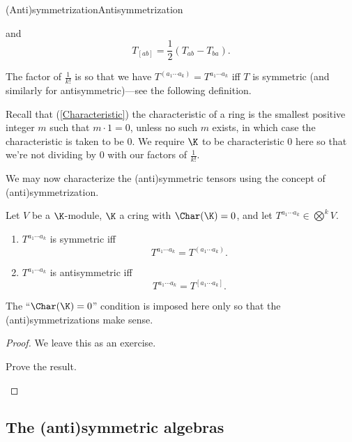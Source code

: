 \begin{dfn}{(Anti)symmetrization}{Antisymmetrization}
\begin{rmk}
		and
		\begin{equation}
			T_{[ab]}=\frac{1}{2}(T_{ab}-T_{ba}).
		\end{equation}
	\end{rmk}
	\begin{rmk}
		The factor of $\frac{1}{k!}$ is so that we have $T^{(a_1\cdots a_k)}=T^{a_1\cdots a_k}$ iff $T$ is symmetric (and similarly for antisymmetric)---see the following definition.
	\end{rmk}
	\begin{rmk}
		Recall that (\cref{Characteristic}) the characteristic of a ring is the smallest positive integer $m$ such that $m\cdot 1=0$, unless no such $m$ exists, in which case the characteristic is taken to be $0$.  We require $\K$ to be characteristic $0$ here so that we're not dividing by $0$ with our factors of $\frac{1}{k!}$.
	\end{rmk}
\end{dfn}
We may now characterize the (anti)symmetric tensors using the concept of (anti)symmetrization.
\begin{prp}{}{}
	Let $V$ be a $\K$-module, $\K$ a cring with $\Char (\K )=0$, and let $T^{a_1\cdots a_k}\in \bigotimes ^kV$.
	\begin{enumerate}
		\item $T^{a_1\cdots a_k}$ is symmetric iff
		\begin{equation}
			T^{a_1\cdots a_k}=T^{(a_1\cdots a_k)}.
		\end{equation}
		\item $T^{a_1\cdots a_k}$ is antisymmetric iff
		\begin{equation}
			T^{a_1\cdots a_k}=T^{[a_1\cdots a_k]}.
		\end{equation}
	\end{enumerate}
	\begin{rmk}
		The ``$\Char (\K )=0$'' condition is imposed here only so that the (anti)symmetrizations make sense.
	\end{rmk}
	\begin{proof}
		We leave this as an exercise.
		\begin{exr}[breakable=false]{}{}
			Prove the result.
		\end{exr}
	\end{proof}
\end{prp}

\subsection{The (anti)symmetric algebras}

